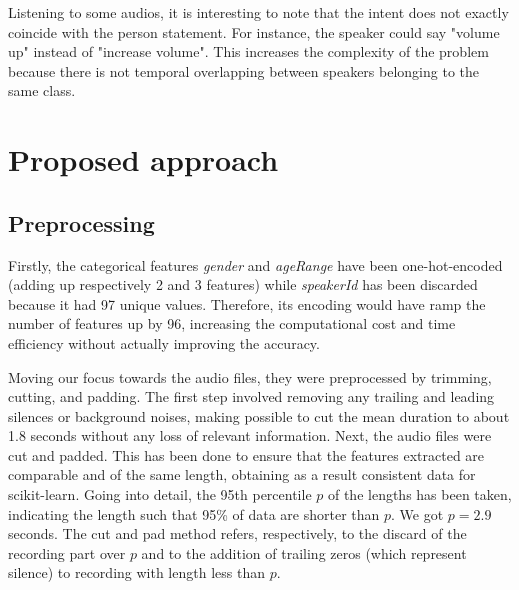 \documentclass[conference]{IEEEtran}
\begin{document}
Listening to some audios, it is interesting to note that the intent does not exactly coincide with the person statement.
For instance, the speaker could say "volume up" instead of "increase volume".
This increases the complexity of the problem because there is not temporal overlapping between speakers belonging to the same class.

\section{Proposed approach}
\subsection{Preprocessing}

Firstly, the categorical features \textit{gender} and \textit{ageRange} have been one-hot-encoded (adding up respectively 2 and 3 features) while \textit{speakerId} has been discarded because it had 97 unique values.
Therefore, its encoding would have ramp the number of features up by 96, increasing the computational cost and time efficiency without actually improving the accuracy.

Moving our focus towards the audio files, they were preprocessed by trimming, cutting, and padding.
The first step involved removing any trailing and leading silences or background noises, making possible to cut the mean duration to about 1.8 seconds without any loss of relevant information.
Next, the audio files were cut and padded.
This has been done to ensure that the features extracted are comparable and of the same length, obtaining as a result consistent data for scikit-learn.
Going into detail, the 95th percentile $p$ of the lengths has been taken, indicating the length such that 95\% of data are shorter than $p$.
We got $p = 2.9$ seconds.
The cut and pad method refers, respectively, to the discard of the recording part over $p$ and to the addition of trailing zeros (which represent silence) to recording with length less than $p$.
\end{document}
